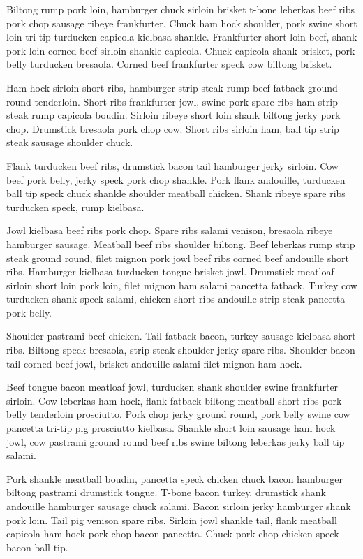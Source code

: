 Biltong rump pork loin, hamburger chuck sirloin brisket t-bone leberkas beef ribs pork chop sausage ribeye frankfurter. Chuck ham hock shoulder, pork swine short loin tri-tip turducken capicola kielbasa shankle. Frankfurter short loin beef, shank pork loin corned beef sirloin shankle capicola. Chuck capicola shank brisket, pork belly turducken bresaola. Corned beef frankfurter speck cow biltong brisket.

Ham hock sirloin short ribs, hamburger strip steak rump beef fatback ground round tenderloin. Short ribs frankfurter jowl, swine pork spare ribs ham strip steak rump capicola boudin. Sirloin ribeye short loin shank biltong jerky pork chop. Drumstick bresaola pork chop cow. Short ribs sirloin ham, ball tip strip steak sausage shoulder chuck.

Flank turducken beef ribs, drumstick bacon tail hamburger jerky sirloin. Cow beef pork belly, jerky speck pork chop shankle. Pork flank andouille, turducken ball tip speck chuck shankle shoulder meatball chicken. Shank ribeye spare ribs turducken speck, rump kielbasa.

Jowl kielbasa beef ribs pork chop. Spare ribs salami venison, bresaola ribeye hamburger sausage. Meatball beef ribs shoulder biltong. Beef leberkas rump strip steak ground round, filet mignon pork jowl beef ribs corned beef andouille short ribs. Hamburger kielbasa turducken tongue brisket jowl. Drumstick meatloaf sirloin short loin pork loin, filet mignon ham salami pancetta fatback. Turkey cow turducken shank speck salami, chicken short ribs andouille strip steak pancetta pork belly.

Shoulder pastrami beef chicken. Tail fatback bacon, turkey sausage kielbasa short ribs. Biltong speck bresaola, strip steak shoulder jerky spare ribs. Shoulder bacon tail corned beef jowl, brisket andouille salami filet mignon ham hock.

Beef tongue bacon meatloaf jowl, turducken shank shoulder swine frankfurter sirloin. Cow leberkas ham hock, flank fatback biltong meatball short ribs pork belly tenderloin prosciutto. Pork chop jerky ground round, pork belly swine cow pancetta tri-tip pig prosciutto kielbasa. Shankle short loin sausage ham hock jowl, cow pastrami ground round beef ribs swine biltong leberkas jerky ball tip salami.

Pork shankle meatball boudin, pancetta speck chicken chuck bacon hamburger biltong pastrami drumstick tongue. T-bone bacon turkey, drumstick shank andouille hamburger sausage chuck salami. Bacon sirloin jerky hamburger shank pork loin. Tail pig venison spare ribs. Sirloin jowl shankle tail, flank meatball capicola ham hock pork chop bacon pancetta. Chuck pork chop chicken speck bacon ball tip.

